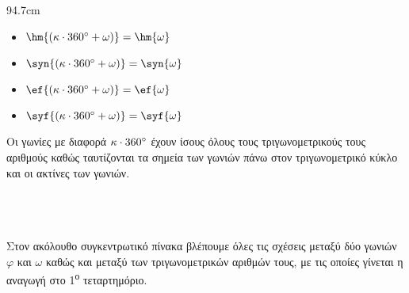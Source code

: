 \documentclass[twoside,nofonts,internet,shmeiwseis]{thewria}
\newcommand{\tss}[1]{\textsuperscript{#1}}
\begin{document}
\begin{enumerate}[itemsep=0mm,label=\bf\arabic*.]
\begin{minipage}{\linewidth}
\begin{WrapText2}{9}{4.7cm}
\end{WrapText2}
\begin{multicols}{2}
\begin{itemize}[itemsep=0mm,leftmargin=4mm]
\item $ \hm{\left( \kappa\cdot360\degree+\omega\right)}=\hm{\omega} $
\item $ \syn{\left(
\kappa\cdot360\degree+\omega\right)}=\syn{\omega}$
\item $ \ef{\left( \kappa\cdot360\degree+\omega\right) }=\ef{\omega} $
\item $ \syf{\left( \kappa\cdot360\degree+\omega\right) }=\syf{\omega} $
\end{itemize}
\end{multicols}
Οι γωνίες με διαφορά $ \kappa\cdot360\degree $ έχουν ίσους όλους τους τριγωνομετρικούς τους αριθμούς καθώς ταυτίζονται τα σημεία των γωνιών πάνω στον τριγωνομετρικό κύκλο και οι ακτίνες των γωνιών.
\end{minipage}
\end{enumerate}\mbox{}\\\\\\
Στον ακόλουθο συγκεντρωτικό πίνακα βλέπουμε όλες τις σχέσεις μεταξύ δύο γωνιών $ \varphi $ και $ \omega $ καθώς και μεταξύ των τριγωνομετρικών αριθμών τους, με τις οποίες γίνεται η αναγωγή στο 1\tss{ο} τεταρτημόριο.
\end{document}
